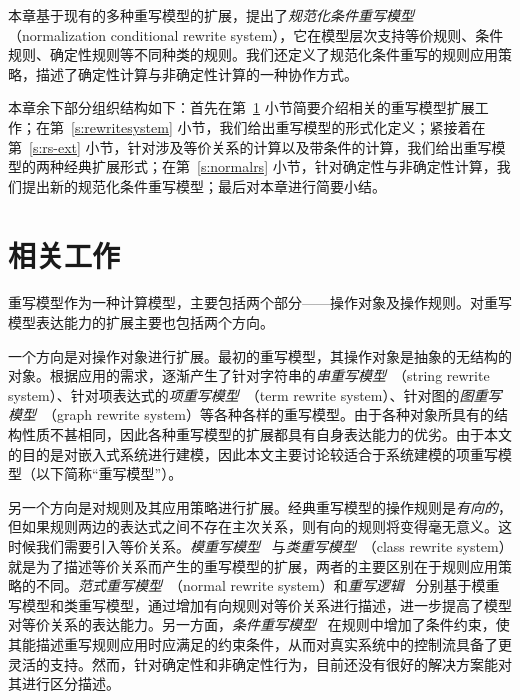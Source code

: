 本章基于现有的多种重写模型的扩展，提出了\emph{规范化条件重写模型}（normalization conditional rewrite system），它在模型层次支持等价规则、条件规则、确定性规则等不同种类的规则。我们还定义了规范化条件重写的规则应用策略，描述了确定性计算与非确定性计算的一种协作方式。

本章余下部分组织结构如下：首先在第~\ref{s:rs-related} 小节简要介绍相关的重写模型扩展工作；在第~\ref{s:rewritesystem} 小节，我们给出重写模型的形式化定义；紧接着在第~\ref{s:rs-ext} 小节，针对涉及等价关系的计算以及带条件的计算，我们给出重写模型的两种经典扩展形式；在第~\ref{s:normalrs} 小节，针对确定性与非确定性计算，我们提出新的规范化条件重写模型；最后对本章进行简要小结。

\section{相关工作}
\label{s:rs-related}

重写模型作为一种计算模型，主要包括两个部分——操作对象及操作规则。对重写模型表达能力的扩展主要也包括两个方向。

一个方向是对操作对象进行扩展。最初的重写模型，其操作对象是抽象的无结构的对象。根据应用的需求，逐渐产生了针对字符串的\emph{串重写模型}~\cite{DBLP:journals/jsc/Book87}（string rewrite system）、针对项表达式的\emph{项重写模型}~\cite{terese}（term rewrite system）、针对图的\emph{图重写模型}~\cite{DBLP:journals/tcs/Raoult84}（graph rewrite system）等各种各样的重写模型。由于各种对象所具有的结构性质不甚相同，因此各种重写模型的扩展都具有自身表达能力的优劣。由于本文的目的是对嵌入式系统进行建模，因此本文主要讨论较适合于系统建模的项重写模型（以下简称“重写模型”）。

另一个方向是对规则及其应用策略进行扩展。经典重写模型的操作规则是\emph{有向的}，但如果规则两边的表达式之间不存在主次关系，则有向的规则将变得毫无意义。这时候我们需要引入等价关系。\emph{模重写模型}~\cite{DBLP:journals/jacm/PetersonS81} 与\emph{类重写模型}~\cite{lankford77b}（class rewrite system）就是为了描述等价关系而产生的重写模型的扩展，两者的主要区别在于规则应用策略的不同。\emph{范式重写模型}~\cite{DBLP:conf/csl/JouannaudL12}（normal rewrite system）和\emph{重写逻辑}~\cite{DBLP:journals/tcs/Marte-OlietM02,DBLP:journals/jlp/Meseguer12} 分别基于模重写模型和类重写模型，通过增加有向规则对等价关系进行描述，进一步提高了模型对等价关系的表达能力。另一方面，\emph{条件重写模型}~\cite{DBLP:conf/ctrs/Gramlich94} 在规则中增加了条件约束，使其能描述重写规则应用时应满足的约束条件，从而对真实系统中的控制流具备了更灵活的支持。然而，针对确定性和非确定性行为，目前还没有很好的解决方案能对其进行区分描述。

